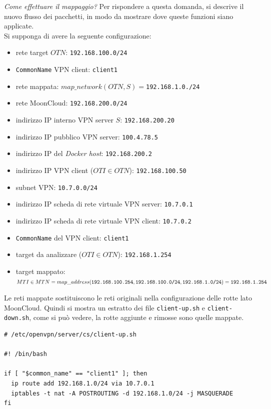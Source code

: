 \textit{Come effettuare il mappaggio?} Per rispondere a questa domanda, si descrive
il nuovo flusso dei pacchetti, in modo da mostrare dove queste funzioni siano
applicate.\\
Si supponga di avere la seguente configurazione:
\begin{itemize}
  \item rete target $OTN$: \texttt{192.168.100.0/24}
  \item \texttt{CommonName} VPN client: \texttt{client1}
  \item rete mappata: $map\_network(OTN, S)=$\texttt{192.168.1.0./24}
  \item rete MoonCloud: \texttt{192.168.200.0/24}
  \item indirizzo IP interno VPN server $S$: \texttt{192.168.200.20}
  \item indirizzo IP pubblico VPN server: \texttt{100.4.78.5}
  \item indirizzo IP del \textit{Docker host}: \texttt{192.168.200.2}
  \item indirizzo IP VPN client ($OTI \in OTN$): \texttt{192.168.100.50}
  \item subnet VPN: \texttt{10.7.0.0/24}
  \item indirizzo IP scheda di rete virtuale VPN server: \texttt{10.7.0.1}
  \item indirizzo IP scheda di rete virtuale VPN client: \texttt{10.7.0.2}
  \item \texttt{CommonName} del VPN client: \texttt{client1}
  \item target da analizzare ($OTI \in OTN$): \texttt{192.168.1.254}
  \item target mappato: $MTI \in MTN=map\_address(\texttt{192.168.100.254},\\
  \texttt{192.168.100.0/24},
  \texttt{192.168.1.0/24})=\texttt{192.168.1.254}$
\end{itemize}
Le reti mappate sostituiscono le reti originali nella configurazione delle rotte lato
MoonCloud. Quindi si mostra un estratto dei file \texttt{client-up.sh} e
\texttt{client-down.sh}, come si può vedere, la rotte aggiunte e rimosse sono
quelle mappate.
\begin{verbatim}
# /etc/openvpn/server/cs/client-up.sh

#! /bin/bash

if [ "$common_name" == "client1" ]; then
  ip route add 192.168.1.0/24 via 10.7.0.1
  iptables -t nat -A POSTROUTING -d 192.168.1.0/24 -j MASQUERADE
fi
\end{verbatim}
